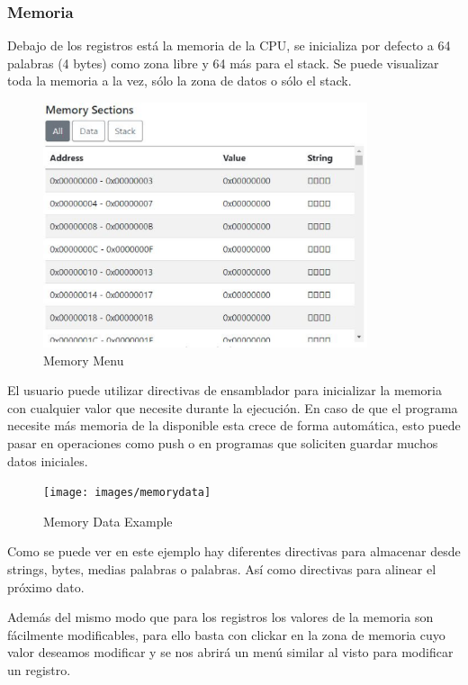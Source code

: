 {{        }

        \newpage
        \subsubsection{Memoria}
        {
            Debajo de los registros está la memoria de la CPU, se inicializa por defecto a 64 palabras (4 bytes)
            como zona libre y 64 más para el stack. Se puede visualizar toda la memoria a la vez, sólo la zona de datos o sólo el stack.

            \begin{figure}[h]
                \centering
                \includegraphics[width=0.85\textwidth]{images/memory}
                \caption{Memory Menu}
            \end{figure}

            El usuario puede utilizar directivas de ensamblador para inicializar la memoria
            con cualquier valor que necesite durante la ejecución. En caso de que el programa necesite más memoria de la disponible esta crece de forma automática, esto puede pasar
            en operaciones como push o en programas que soliciten guardar muchos datos iniciales.

            \begin{figure}[h]
                \centering
                \texttt{[image: images/memorydata]}
                \caption{Memory Data Example}
            \end{figure}
            Como se puede ver en este ejemplo hay diferentes directivas para almacenar desde strings, bytes, medias palabras
            o palabras. Así como directivas para alinear el próximo dato.

            Además del mismo modo que para los registros los valores de la memoria son fácilmente modificables,
            para ello basta con clickar en la zona de memoria cuyo valor deseamos modificar y se nos abrirá un menú similar al visto
            para modificar un registro.

}}
